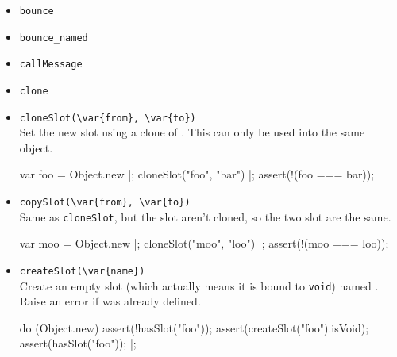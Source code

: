 \begin{itemize}
\item \lstinline|bounce|\\

\item \lstinline|bounce_named|\\

\item \lstinline|callMessage|\\

\item \lstinline|clone|\\

\item \lstinline|cloneSlot(\var{from}, \var{to})|\\
  Set the new slot  using a clone of . This can only
  be used into the same object.

\begin{urbiscript}[firstnumber=last]
var foo = Object.new |;
cloneSlot("foo", "bar") |;
assert(!(foo === bar));
\end{urbiscript}

\item \lstinline|copySlot(\var{from}, \var{to})|\\
  Same as \lstinline|cloneSlot|, but the slot aren't cloned, so the
  two slot are the same.

\begin{urbiscript}[firstnumber=last]
var moo = Object.new |;
cloneSlot("moo", "loo") |;
assert(!(moo === loo));
\end{urbiscript}

\item \lstinline|createSlot(\var{name})|\\
  Create an empty slot (which actually means it is bound to
  \lstinline|void|) named .  Raise an error if 
  was already defined.
\begin{urbiscript}[firstnumber=last]
do (Object.new)
{
  assert(!hasSlot("foo"));
  assert(createSlot("foo").isVoid);
  assert(hasSlot("foo"));
}|;
\end{urbiscript}


\end{itemize}

